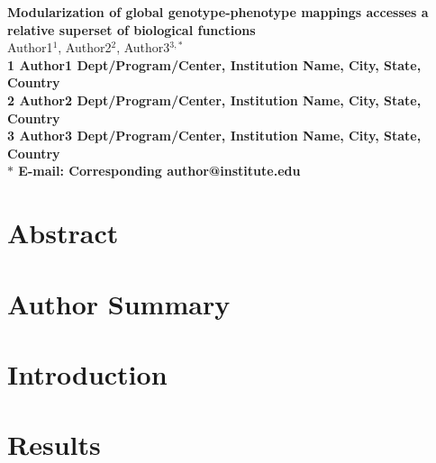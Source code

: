 



\begin{flushleft}
{\Large
\textbf{Modularization of global genotype-phenotype mappings accesses a relative superset of biological functions}
}
\\
Author1$^{1}$,
Author2$^{2}$,
Author3$^{3,\ast}$
\\
\bf{1} Author1 Dept/Program/Center, Institution Name, City, State, Country
\\
\bf{2} Author2 Dept/Program/Center, Institution Name, City, State, Country
\\
\bf{3} Author3 Dept/Program/Center, Institution Name, City, State, Country
\\
$\ast$ E-mail: Corresponding author@institute.edu
\end{flushleft}

\section*{Abstract}


\section*{Author Summary}


\section*{Introduction}


\section*{Results}


